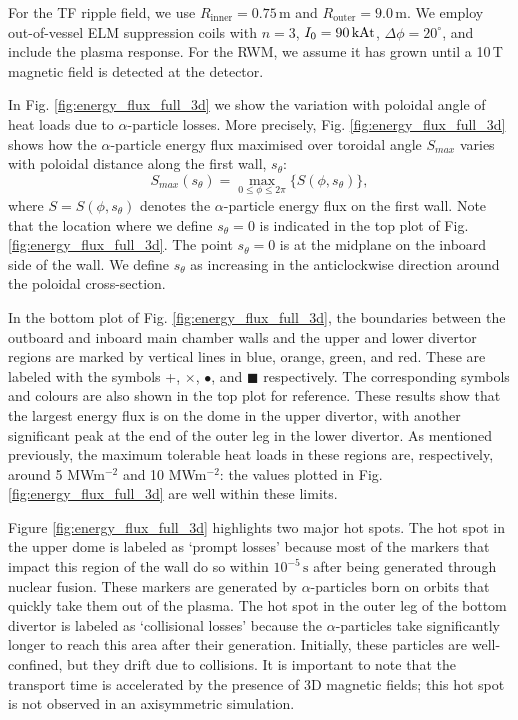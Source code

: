 \documentclass[10pt, a4paper, twoside]{article}
\begin{document}
For the TF ripple field, we use $R_{\text{inner}} = 0.75\,\text{m}$ and $R_{\text{outer}} = 9.0\,\text{m}$. We employ out-of-vessel ELM suppression coils with $n=3$, $I_0= \text{90\,kAt}$, $\Delta \phi = 20^\circ$, and include the plasma response. For the RWM, we assume it has grown until a 10\,T magnetic field is detected at the detector.

In Fig. \ref{fig:energy_flux_full_3d} we show the variation with poloidal angle of heat loads due to $\alpha$-particle losses. More precisely, Fig. \ref{fig:energy_flux_full_3d} shows how the $\alpha$-particle energy flux maximised over toroidal angle $S_{max}$ varies with poloidal distance along the first wall, $s_\theta$:
\begin{equation}
    \label{eq:max_alpha_particle_energy_flux}
    S_{max}(s_\theta) = \max_{0\le \phi \le 2\pi}\{S(\phi, s_\theta)\},
\end{equation}
where $S=S(\phi, s_\theta)$ denotes the $\alpha$-particle energy flux on the first wall. Note that the location where we define \( s_\theta = 0 \) is indicated in the top plot of Fig. \ref{fig:energy_flux_full_3d}. The point \( s_\theta = 0 \) is at the midplane on the inboard side of the wall. We define \( s_\theta \) as increasing in the anticlockwise direction around the poloidal cross-section.

In the bottom plot of Fig. \ref{fig:energy_flux_full_3d}, the boundaries between the outboard and inboard main chamber walls and the upper and lower divertor regions are marked by vertical lines in blue, orange, green, and red. These are labeled with the symbols +, $\times$, $\bullet$, and $\blacksquare$ respectively. The corresponding symbols and colours are also shown in the top plot for reference. These results show that the largest energy flux is on the dome in the upper divertor, with another significant peak at the end of the outer leg in the lower divertor. As mentioned previously, the maximum tolerable heat loads in these regions are, respectively, around 5 MWm$^{-2}$ and 10 MWm$^{-2}$: the values plotted in Fig. \ref{fig:energy_flux_full_3d} are well within these limits. 

Figure \ref{fig:energy_flux_full_3d} highlights two major hot spots. The hot spot in the upper dome is labeled as `prompt losses' because most of the markers that impact this region of the wall do so within \(10^{-5}\,\text{s}\) after being generated through nuclear fusion. These markers are generated by $\alpha$-particles born on orbits that quickly take them out of the plasma. The hot spot in the outer leg of the bottom divertor is labeled as `collisional losses' because the $\alpha$-particles take significantly longer to reach this area after their generation. Initially, these particles are well-confined, but they drift due to collisions. It is important to note that the transport time is accelerated by the presence of 3D magnetic fields; this hot spot is not observed in an axisymmetric simulation.
\end{document}

